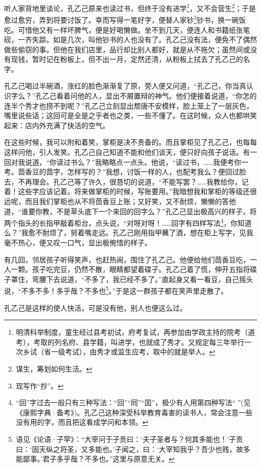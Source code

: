 \documentclass[12pt,UTF8]{ctexbook}
\begin{document}
听人家背地里谈论，孔乙己原来也读过书，但终于没有进学\footnote{明清科举制度，童生经过县考初试，府考复试，再参加由学政主持的院考（道考），考取的列名府、县学籍，叫进学，也就成了秀才。又规定每三年举行一次乡试（省一级考试），由秀才或监生应考，取中的就是举人。}，又不会营生\footnote{谋生，筹划如何生活。}；于是愈过愈穷，弄到将要讨饭了。幸而写得一笔好字，便替人家钞\footnote{现写作“抄”。}钞书，换一碗饭吃。可惜他又有一样坏脾气，便是好喝懒做。坐不到几天，便连人和书籍纸张笔砚，一齐失踪。如是几次，叫他钞书的人也没有了。孔乙己没有法，便免不了偶然做些偷窃的事。但他在我们店里，品行却比别人都好，就是从不拖欠；虽然间或没有现钱，暂时记在粉板上，但不出一月，定然还清，从粉板上拭去了孔乙己的名字。

孔乙己喝过半碗酒，涨红的脸色渐渐复了原，旁人便又问道，“孔乙己，你当真认识字么？”孔乙己看着问他的人，显出不屑置辩的神气。他们便接着说道，“你怎的连半个秀才也捞不到呢？”孔乙己立刻显出颓唐不安模样，脸上笼上了一层灰色，嘴里说些话；这回可是全是之乎者也之类，一些不懂了。在这时候，众人也都哄笑起来：店内外充满了快活的空气。

在这些时候，我可以附和着笑，掌柜是决不责备的。而且掌柜见了孔乙己，也每每这样问他，引人发笑。孔乙己自己知道不能和他们谈天，便只好向孩子说话。有一回对我说道，“你读过书么？”我略略点一点头。他说，“读过书，……我便考你一考。茴香豆的茴字，怎样写的？”我想，讨饭一样的人，也配考我么？便回过脸去，不再理会。孔乙己等了许久，很恳切的说道，“不能写罢？……我教给你，记着！这些字应该记着。将来做掌柜的时候，写账要用。”我暗想我和掌柜的等级还很远呢，而且我们掌柜也从不将茴香豆上账；又好笑，又不耐烦，懒懒的答他道，“谁要你教，不是草头底下一个来回的回字么？”孔乙己显出极高兴的样子，将两个指头的长指甲敲着柜台，点头说，“对呀对呀！……回字有四样写法\footnote{“回”字过去一般只有三种写法：“回”“囘”“囬”，极少有人用第四种写法“𡇌”(见《康熙字典·备考》)。孔乙己这种深受科举教育毒害的读书人，常会注意一些没有用的字，而且把这看成学问和本领。}，你知道么？”我愈不耐烦了，努着嘴走远。孔乙己刚用指甲蘸了酒，想在柜上写字，见我毫不热心，便又叹一口气，显出极惋惜的样子。

有几回，邻居孩子听得笑声，也赶热闹，围住了孔乙己。他便给他们茴香豆吃，一人一颗。孩子吃完豆，仍然不散，眼睛都望着碟子。孔乙己着了慌，伸开五指将碟子罩住，弯腰下去说道，“不多了，我已经不多了。”直起身又看一看豆，自己摇头说，“不多不多！多乎哉？不多也\footnote{语见《论语·子罕》：“大宰问于子贡曰：‘夫子圣者与？何其多能也！’子贡曰：‘固天纵之将圣，又多能也。’子闻之，曰：‘大宰知我乎？吾少也贱，故多能鄙事。’君子多乎哉？不多也。”这里与原意无关。}。”于是这一群孩子都在笑声里走散了。

孔乙己是这样的使人快活，可是没有他，别人也便这么过。
\end{document}

